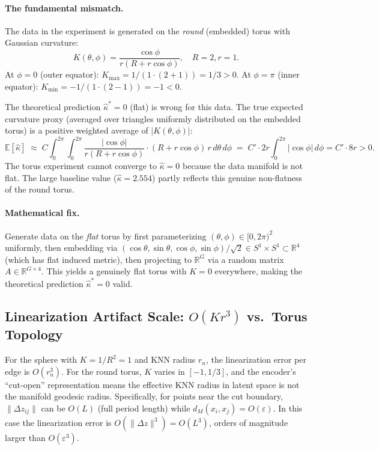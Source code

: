 \documentclass[11pt]{article}
\newcommand{\R}{\mathbb{R}}
\newcommand{\E}{\mathbb{E}}
\begin{document}
\paragraph{The fundamental mismatch.}
The data in the experiment is generated on the \emph{round} (embedded) torus
with Gaussian curvature:
\[
    K(\theta, \phi) = \frac{\cos\phi}{r(R + r\cos\phi)},
    \quad R = 2, r = 1.
\]
At $\phi = 0$ (outer equator): $K_{\max} = 1/(1 \cdot (2+1)) = 1/3 > 0$.
At $\phi = \pi$ (inner equator): $K_{\min} = -1/(1 \cdot (2-1)) = -1 < 0$.

The theoretical prediction $\hat\kappa^* = 0$ (flat) is wrong for this data.
The true expected curvature proxy (averaged over triangles uniformly distributed
on the embedded torus) is a positive weighted average of $|K(\theta,\phi)|$:
\[
    \E[\hat\kappa] \;\approx\; C \int_0^{2\pi}\int_0^{2\pi}
    \frac{|\cos\phi|}{r(R+r\cos\phi)} \cdot (R + r\cos\phi) \,r\, d\theta\, d\phi
    \;=\; C' \cdot 2r \int_0^{2\pi} |\cos\phi|\, d\phi = C' \cdot 8r > 0.
\]
The torus experiment cannot converge to $\hat\kappa = 0$ because the data
manifold is not flat. The large baseline value ($\hat\kappa = 2.554$) partly
reflects this genuine non-flatness of the round torus.

\paragraph{Mathematical fix.}
Generate data on the \emph{flat} torus by first parameterizing
$(\theta, \phi) \in [0,2\pi)^2$ uniformly, then embedding via
$(\cos\theta, \sin\theta, \cos\phi, \sin\phi)/\sqrt{2} \in S^1 \times S^1 \subset \R^4$
(which has flat induced metric), then projecting to $\R^G$ via a random matrix
$A \in \R^{G \times 4}$. This yields a genuinely flat torus with $K = 0$ everywhere,
making the theoretical prediction $\hat\kappa^* = 0$ valid.

\subsection{Linearization Artifact Scale: $O(K r^3)$ vs.\ Torus Topology}

For the sphere with $K = 1/R^2 = 1$ and KNN radius $r_n$, the linearization error
per edge is $O(r_n^3)$. For the round torus, $K$ varies in $[-1, 1/3]$, and the
encoder's ``cut-open'' representation means the effective KNN radius in latent
space is not the manifold geodesic radius. Specifically, for points near the
cut boundary, $\|\Delta z_{ij}\|$ can be $O(L)$ (full period length) while
$d_M(x_i, x_j) = O(\varepsilon)$. In this case the linearization error is
$O(\|\Delta z\|^3) = O(L^3)$, orders of magnitude larger than $O(\varepsilon^3)$.
\end{document}
